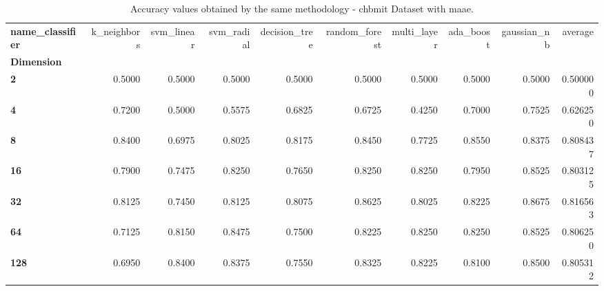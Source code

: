 \begin{table}
\centering
\caption{Accuracy values obtained by the same methodology - chbmit Dataset with maae.}
\label{accuracy_chbmit_maae-reproduction}
\begin{tabular}{lrrrrrrrrr}
\toprule
\textbf{name\_classifier} &  k\_neighbors &  svm\_linear &  svm\_radial &  decision\_tree &  random\_forest &  multi\_layer &  ada\_boost &  gaussian\_nb &   average \\
\textbf{Dimension} &              &             &             &                &                &              &            &              &           \\
\midrule
\textbf{2        } &       0.5000 &      0.5000 &      0.5000 &         0.5000 &         0.5000 &       0.5000 &     0.5000 &       0.5000 &  0.500000 \\
\textbf{4        } &       0.7200 &      0.5000 &      0.5575 &         0.6825 &         0.6725 &       0.4250 &     0.7000 &       0.7525 &  0.626250 \\
\textbf{8        } &       0.8400 &      0.6975 &      0.8025 &         0.8175 &         0.8450 &       0.7725 &     0.8550 &       0.8375 &  0.808437 \\
\textbf{16       } &       0.7900 &      0.7475 &      0.8250 &         0.7650 &         0.8250 &       0.8250 &     0.7950 &       0.8525 &  0.803125 \\
\textbf{32       } &       0.8125 &      0.7450 &      0.8125 &         0.8075 &         0.8625 &       0.8025 &     0.8225 &       0.8675 &  0.816563 \\
\textbf{64       } &       0.7125 &      0.8150 &      0.8475 &         0.7500 &         0.8225 &       0.8250 &     0.8250 &       0.8525 &  0.806250 \\
\textbf{128      } &       0.6950 &      0.8400 &      0.8375 &         0.7550 &         0.8325 &       0.8225 &     0.8100 &       0.8500 &  0.805312 \\
\bottomrule
\end{tabular}
\end{table}
